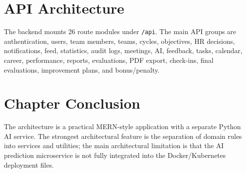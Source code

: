 \section{API Architecture}
The backend mounts 26 route modules under \texttt{/api}. The main API groups are authentication, users, team members, teams, cycles, objectives, HR decisions, notifications, feed, statistics, audit logs, meetings, AI, feedback, tasks, calendar, career, performance, reports, evaluations, PDF export, check-ins, final evaluations, improvement plans, and bonus/penalty.

\section{Chapter Conclusion}
The architecture is a practical MERN-style application with a separate Python AI service. The strongest architectural feature is the separation of domain rules into services and utilities; the main architectural limitation is that the AI prediction microservice is not fully integrated into the Docker/Kubernetes deployment files.
